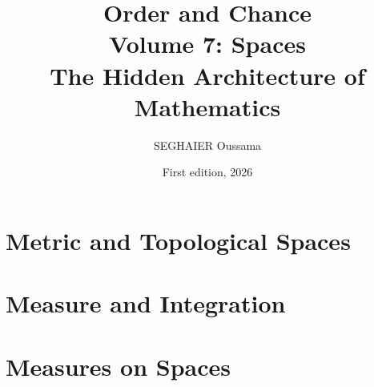 \documentclass[11pt,openany]{book}
\title{\Huge\textbf{Order and Chance}\\[0.4em]\LARGE Volume 7: Spaces\\[0.6em]
\Large The Hidden Architecture of Mathematics}
\author{SEGHAIER Oussama}
\date{First edition, 2026}
\begin{document}
\frontmatter
\makecover
\maketitle

\tableofcontents

\mainmatter

\part{Metric and Topological Spaces}






\part{Measure and Integration}




\part{Measures on Spaces}




\backmatter


\end{document}
